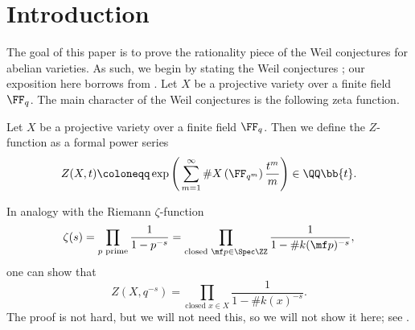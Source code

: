 \documentclass{amsart}
\begin{document}
\section{Introduction}
The goal of this paper is to prove the rationality piece of the Weil conjectures for abelian varieties. As such, we begin by stating the Weil conjectures \cite{weil-conj}; our exposition here borrows from \cite{raskin-weil-conj}. Let $X$ be a projective variety over a finite field $\FF_q$. The main character of the Weil conjectures is the following zeta function.
\begin{definition}[$Z$-function]
	Let $X$ be a projective variety over a finite field $\FF_q$. Then we define the $Z$-function as a formal power series
	\begin{equation}
		Z(X,t)\coloneqq\exp\Bigg(\sum_{m=1}^\infty\#X\left(\FF_{q^m}\right)\frac{t^m}m\Bigg)\in\QQ\bb{t}. \label{eq:zeta-via-exp}
	\end{equation}
\end{definition}
\begin{remark}
	In analogy with the Riemann $\zeta$-function
	\[\zeta(s)=\prod_{p\text{ prime}}\frac1{1-p^{-s}}=\prod_{\text{closed }\mf p\in\Spec\ZZ}\frac1{1-\#k(\mf p)^{-s}},\]
	one can show that
	\[Z\left(X,q^{-s}\right)=\prod_{\text{closed }x\in X}\frac1{1-\#k(x)^{-s}}.\]
	The proof is not hard, but we will not need this, so we will not show it here; see \cite[Proposition~1.5]{raskin-weil-conj}.
\end{remark}
	
\end{document}
